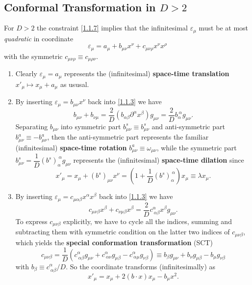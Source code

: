 \documentclass[10pt,nofootinbib]{revtex4}
\begin{document}
	\subsection{Conformal Transformation in $D>2$}
		For $D>2$ the constraint \eqref{1.1.7} implies that the infinitesimal $\varepsilon_\mu$ must be at most \emph{quadratic} in coordinate
		\begin{equation*}
			\varepsilon_\mu=a_\mu+b_{\mu\nu}x^\nu+c_{\mu\nu\rho}x^\nu x^\rho
		\end{equation*}
		with the symmetric $c_{\mu\nu\rho}\equiv c_{\mu\rho\nu}$.\par
		\begin{enumerate}[1)]
			\item Clearly $\varepsilon_\mu=a_\mu$ represents the (infinitesimal) \textbf{space-time translation} $x'_\mu\mapsto x_\mu+a_\mu$ as ususal.
			\item By inserting $\varepsilon_\mu=b_{\mu\nu}x^\nu$ back into \eqref{1.1.3} we have
				\begin{equation*}
					b_{\mu\nu}+b_{\nu\mu}=\dfrac{2}{D}(b_{\alpha\beta} \partial^\alpha x^\beta) g_{\mu\nu}=\dfrac{2}{D}b_\alpha^{~\alpha}g_{\mu\nu}.
				\end{equation*}
				Separating $b_{\mu\nu}$ into symmetric part $b^s_{\mu\nu}\equiv b^s_{\mu\nu}$ and anti-symmetric part $b^a_{\mu\nu}\equiv-b^a_{\mu\nu}$, then the anti-symmetric part represents the familiar (infinitesimal) \textbf{space-time rotation} $b^a_{\mu\nu}\equiv\omega_{\mu\nu}$, while the symmetric part $b^s_{\mu\nu}=\dfrac{1}{D}(b^s)_\alpha^{~\alpha}g_{\mu\nu}$ represents the (infinitesimal) \textbf{space-time dilation} since
				\begin{equation*}
					x'_\mu=x_\mu+(b^s)_{\mu\nu}x^\nu=\left(1+\dfrac{1}{D}(b^s)_\alpha^{~\alpha}\right)x_\mu\equiv\lambda x_\mu.
				\end{equation*}
			\item By inserting $\varepsilon_\mu=c_{\mu \alpha\beta}x^\alpha x^\beta$ back into \eqref{1.1.3} we have
				\begin{equation*}
					c_{\mu\nu\beta}x^\beta+c_{\nu\mu\beta}x^\beta=\dfrac{2}{D}c^\alpha_{~\alpha\beta}x^\beta g_{\mu\nu}.
				\end{equation*}
				To express $c_{\mu\nu\beta}$ explicitly, we have to cycle all the indices, summing and subtracting them with symmetric condition on the latter two indices of $c_{\mu\nu\beta}$, which yields the \textbf{special conformation transformation} (SCT)
				\begin{equation*}
					c_{\mu\nu\beta}=\dfrac{1}{D}(c^\alpha_{~\alpha\beta}g_{\mu\nu}+c^\alpha_{~\alpha\nu}g_{\mu\beta}-c^\alpha_{~\alpha\mu}g_{\nu\beta})\equiv b_\beta g_{\mu\nu}+b_\nu g_{\mu\beta}-b_\mu g_{\nu\beta}
				\end{equation*}
				with $b_\beta\equiv c^\alpha_{~\alpha\beta}/D$. So the coordinate transforms (infinitesimally) as
				\begin{equation*}
					x'_\mu=x_\mu+2(b\cdot x)x_\mu-b_\mu x^2.
				\end{equation*}
		\end{enumerate}
\end{document}
